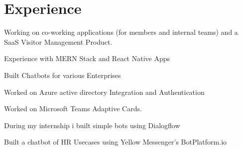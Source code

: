 \documentclass[]{deedy-resume-openfont}
\begin{document}
\hfill
\begin{minipage}[t]{0.66\textwidth} 


\section{Experience}

\vspace{\topsep} %
\begin{tightemize}
\item Working on co-working applications (for members and internal teams) and a SaaS Visitor Management Product.
\item Experience with MERN Stack and React Native Apps
\end{tightemize}
\sectionsep

\descript{  }
\begin{tightemize}
\item Built Chatbots for various Enterprises
\item Worked on Azure active directory Integration and Authentication
\item Worked on Microsoft Teams Adaptive Cards.
\end{tightemize}

\begin{tightemize}
\item During my internship i built simple bots using Dialogflow
\item Built a chatbot of HR Usecases using Yellow Messenger's BotPlatform.io
\end{tightemize}
\sectionsep



\end{minipage}
\end{document}
